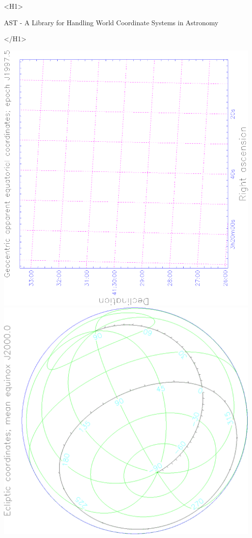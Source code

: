\documentclass[twoside,11pt]{article}
\newcommand{\stardoctitlehtml} {AST - A Library for Handling World Coordinate
                                      Systems in Astronomy}
\newcommand{\xlabel}[1]{}
\begin{document}
\begin{htmlonly}
   \xlabel{}
   \begin{rawhtml} <H1> \end{rawhtml}
      \stardoctitlehtml
   \begin{rawhtml} </H1> \end{rawhtml}

   \includegraphics[scale=0.3,angle=-90]{sun211_figures/fronta.eps}\hfill
   \includegraphics[scale=0.3,angle=-90]{sun211_figures/frontb.eps}\hfill

\end{htmlonly}
\end{document}
